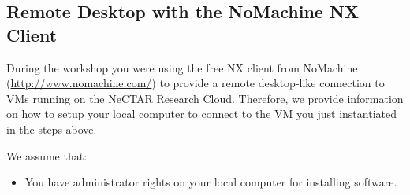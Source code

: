 \subsection{Remote Desktop with the NoMachine NX Client}
During the workshop you were using the free NX client from NoMachine
(\url{http://www.nomachine.com/}) to provide a remote desktop-like connection to
VMs running on the NeCTAR Research Cloud. Therefore, we provide information on how to
setup your local computer to connect to the VM you just instantiated in the steps
above.

We assume that:
\begin{itemize}
\item You have administrator rights on your local computer for installing
software.
\end{itemize}

